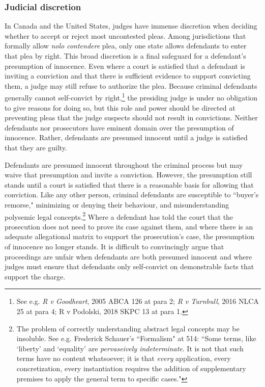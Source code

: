 \subsubsection{Judicial discretion}

In Canada and the United States, judges have immense discretion when deciding whether to accept or reject most uncontested pleas. Among jurisdictions that formally allow \textit{nolo contendere} plea, only one state allows defendants to enter that plea by right. This broad discretion is a final safeguard for a defendant's presumption of innocence. Even where a court is satisfied that a defendant is inviting a conviction and that there is sufficient evidence to support convicting them, a judge may still refuse to authorize the plea. Because criminal defendants generally cannot self-convict by right,\footnote{See e.g. \textit{R v Goodheart}, 2005 ABCA 126 at para 2; \textit{R v Turnbull}, 2016 NLCA 25 at para 4; R v Podolski, 2018 SKPC 13 at para 1.} the presiding judge is under no obligation to give reasons for doing so, but this role and power should be directed at preventing pleas that the judge suspects should not result in convictions. Neither defendants nor prosecutors have eminent domain over the presumption of innocence. Rather, defendants are presumed innocent until a judge is satisfied that they are guilty.

Defendants are presumed innocent throughout the criminal process but may waive that presumption and invite a conviction. However, the presumption still stands until a court is satisfied that there is a reasonable basis for allowing that conviction. Like any other person, criminal defendants are susceptible to ``buyer's remorse," minimizing or denying their behaviour, and misunderstanding polysemic legal concepts.\footnote{The problem of correctly understanding abstract legal concepts may be insoluble. See e.g. Frederick Schauer's ``Formalism" at 514: ``Some terms, like `liberty' and `equality' are \textit{pervaseively indeterminate}. It is not that such terms have no content whatsoever; it is that \textit{every} application, every concretization, every instantiation requires the addition of supplementary premises to apply the general term to specific cases."} Where a defendant has told the court that the prosecution does not need to prove its case against them, and where there is an adequate allegational matrix to support the prosecution's case, the presumption of innocence no longer stands. It is difficult to convincingly argue that proceedings are unfair when defendants are both presumed innocent and where judges must ensure that defendants only self-convict on demonstrable facts that support the charge.

